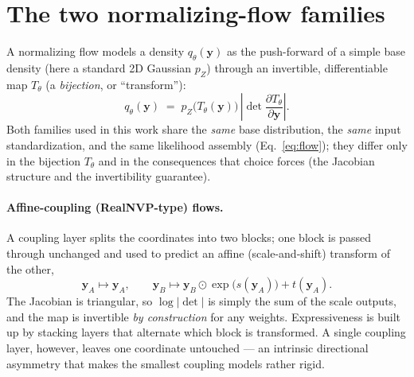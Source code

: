 \documentclass[11pt]{article}
\begin{document}
\appendix

\section{The two normalizing-flow families}
\label{app:flows}

A normalizing flow models a density $q_\theta(\mathbf{y})$ as the
push-forward of a simple base density (here a standard 2D Gaussian
$p_Z$) through an invertible, differentiable map $T_\theta$ (a
\emph{bijection}, or ``transform''):
%
\begin{equation}
q_\theta(\mathbf{y}) \;=\;
p_Z\!\big(T_\theta(\mathbf{y})\big)\,
\left|\det \frac{\partial T_\theta}{\partial \mathbf{y}}\right|.
\label{eq:flow}
\end{equation}
%
Both families used in this work share the \emph{same} base distribution, the
\emph{same} input standardization, and the same likelihood assembly
(Eq.~\eqref{eq:flow}); they differ only in the bijection $T_\theta$ and in
the consequences that choice forces (the Jacobian structure and the
invertibility guarantee).

\paragraph{Affine-coupling (RealNVP-type) flows.}
A coupling layer \cite{dinh2015,dinh2017} splits the coordinates into two
blocks; one block is passed through unchanged and used to predict an affine
(scale-and-shift) transform of the other,
%
\begin{equation}
\mathbf{y}_A \mapsto \mathbf{y}_A, \qquad
\mathbf{y}_B \mapsto \mathbf{y}_B \odot \exp\!\big(s(\mathbf{y}_A)\big)
                 + t(\mathbf{y}_A).
\end{equation}
%
The Jacobian is triangular, so $\log|\det|$ is simply the sum of the scale
outputs, and the map is invertible \emph{by construction} for any weights.
Expressiveness is built up by stacking layers that alternate which block is
transformed. A single coupling layer, however, leaves one coordinate
untouched --- an intrinsic directional asymmetry that makes the smallest
coupling models rather rigid.
\end{document}
